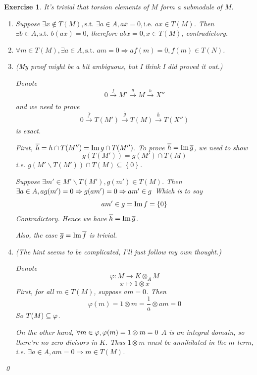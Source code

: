 \documentclass{article}
\theoremstyle{breakstyle}
\newtheorem{exercise}{Exercise}
\let\ker\relax
\DeclareMathOperator{\ker}{Ker}
\DeclareMathOperator{\im}{Im}
\begin{document}
\begin{exercise}
    It's trivial that torsion elements of $M$ form a submodule of $M$.
    \begin{enumerate}[label=({\roman*})]
        \item 
            Suppose $\exists x\not\in T(M),\text{s.t. }\exists a\in A,a\overline{x}=0,\text{i.e. }ax\in T(M)$.
            Then $\exists b\in A,\text{s.t. }b(ax)=0$, therefore $abx=0,x\in T(M)$, contradictory.
        \item 
            $\forall m\in T(M),\exists a\in A,\text{s.t. }am=0\Rightarrow af(m)=0,f(m)\in T(N)$.
        \item 
            \emph{(My proof might be a bit ambiguous, but I think I did proved it out.)}

            Denote 
            $$
            0\xrightarrow[]{f} M'\xrightarrow[]{g} M\xrightarrow[]{h} X''
            $$
            and we need to prove
            $$
            0\xrightarrow[]{\overline{f}} T(M')\xrightarrow[]{\overline{g}} T(M)\xrightarrow[]{\overline{h}} T(X'')
            $$
            is exact.

            First, $\ker{\overline{h}}=\ker{h}\cap T(M'')=\im{g}\cap T(M'')$.
            To prove $\ker{\overline{h}}=\im{\overline{g}}$, we need to show
            $$
            g(T(M'))=g(M')\cap T(M)
            $$
            i.e. $g(M'\backslash T(M'))\cap T(M)\subseteq \left\{ 0 \right\} $.

            Suppose $\exists m'\in M'\backslash T(M'),g(m')\in T(M)$.
            Then $\exists a\in A,ag(m')=0\Rightarrow g(am')=0\Rightarrow am'\in \ker{g}$
            Which is to say
            $$
            am'\in \ker{g}=\im{f}=\left\{ 0 \right\} 
            $$
            Contradictory.
            Hence we have $\ker{\overline{h}}=\im{\overline{g}}$.

            Also, the case $\ker{\overline{g}}=\im{\overline{f}}$ is trivial.
        \item 
            \emph{(The hint seems to be complicated, I'll just follow my own thought.)}

            Denote
            $$
            \varphi:M\longrightarrow K\otimes _{A}M
            $$
            $$
            x\longmapsto 1\otimes x
            $$
            First, for all $m\in T(M)$, suppose $am=0$.
            Then
            $$
            \varphi(m)=1\otimes m=\frac{1}{a}\otimes am=0
            $$
            So $T(M)\subseteq \ker{\varphi}$.

            On the other hand, $\forall m\in \ker{\varphi},\varphi(m)=1\otimes m=0$
            $A$ is an integral domain, so there're no zero divisors in $K$.
            Thus $1\otimes m$ must be annihilated in the $m$ term, i.e. $\exists a\in A,am=0\Rightarrow m\in T(M)$.
    \end{enumerate}
    \qed
\end{exercise}
\end{document}
